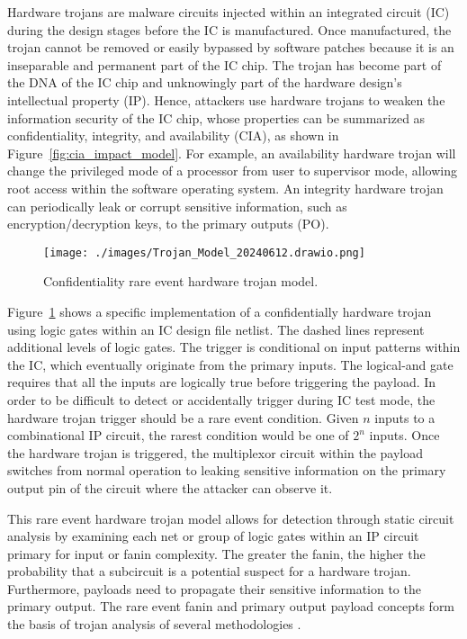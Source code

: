 Hardware trojans are malware circuits injected within an integrated circuit (IC)
during the design stages before the IC is manufactured. Once manufactured, the
trojan cannot be removed or easily bypassed by software patches because it is an
inseparable and permanent part of the IC chip. The trojan has become part of the
DNA of the IC chip and unknowingly part of the hardware design's intellectual
property (IP). Hence, attackers use hardware trojans to weaken the information
security of the IC chip, whose properties can be summarized as confidentiality,
integrity, and availability (CIA), as shown in
Figure~\ref{fig:cia_impact_model}. For example, an availability hardware trojan
will change the privileged mode of a processor from user to supervisor mode,
allowing root access within the software operating system. An integrity hardware
trojan can periodically leak or corrupt sensitive information, such as
encryption/decryption keys, to the primary outputs (PO).

\begin{figure}[H]
    \texttt{[image: ./images/Trojan\_Model\_20240612.drawio.png]}
    \caption{Confidentiality rare event hardware trojan model.}
    \label{fig:cre_impact_model}
\end{figure}

Figure~\ref{fig:cre_impact_model} shows a specific implementation of a
confidentially hardware trojan using logic gates within an IC design file
netlist. The dashed lines represent additional levels of logic gates. The
trigger is conditional on input patterns within the IC, which eventually
originate from the primary inputs. The logical-and gate requires that all the
inputs are logically true before triggering the payload. In order to be
difficult to detect or accidentally trigger during IC test mode, the hardware
trojan trigger should be a rare event condition. Given $n$ inputs to a
combinational IP circuit, the rarest condition would be one of $2^n$ inputs.
Once the hardware trojan is triggered, the multiplexor circuit within the
payload switches from normal operation to leaking sensitive information on the
primary output pin of the circuit where the attacker can observe it.

This rare event hardware trojan model allows for detection through static
circuit analysis by examining each net or group of logic gates within an IP
circuit primary for input or fanin complexity. The greater the fanin, the higher
the probability that a subcircuit is a potential suspect for a hardware trojan.
Furthermore, payloads need to propagate their sensitive information to the
primary output. The rare event fanin and primary output payload concepts form
the basis of trojan analysis of several methodologies \cite{4484928, 7604700,
hasegawa2020hardware, px6s-sm21-22}.

